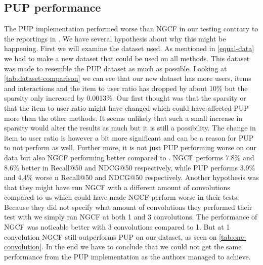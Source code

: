 \subsection{PUP performance}
The PUP implementation performed worse than NGCF in our testing contrary to the reportings in \cite{Priceaware}.
We have several hypothesis about why this might be happening.
First we will examine the dataset used.
As mentioned in \autoref{equal-data} we had to make a new dataset that could be used on all methods.
This dataset was made to resemble the PUP dataset as much as possible.
Looking at \autoref{tab:dataset-comparison} we can see that our new dataset has more users, items and interactions and the item to user ratio has dropped by about 10\% but the sparsity only increased by 0.0013\%.
Our first thought was that the sparsity or that the item to user ratio might have changed which could have affected PUP more than the other methods.
It seems unlikely that such a small increase in sparsity would alter the results as much but it is still a possibility.
The change in item to user ratio is however a bit more significant and can be a reason for PUP to not perform as well.
Further more, it is not just PUP performing worse on our data but also NGCF performing better compared to \cite{Priceaware}.
NGCF performs 7.8\% and 8.6\% better in Recall@50 and NDCG@50 respectively, while PUP performs 3.9\% and 4.4\% worse n Recall@50 and NDCG@50 respectively.
Another hypothesis was that they might have run NGCF with a different amount of convolutions compared to us which could have made NGCF perform worse in their tests.
Because they did not specify what amount of convolutions they performed their test with we simply ran NGCF at both 1 and 3 convolutions.
The performance of NGCF was noticable better with 3 convolutions compared to 1.
But at 1 convolution NGCF still outperforms PUP on our dataset, as seen on \autoref{tab:one-convolution}.
In the end we have to conclude that we could not get the same performance from the PUP implementation as the authors managed to achieve.